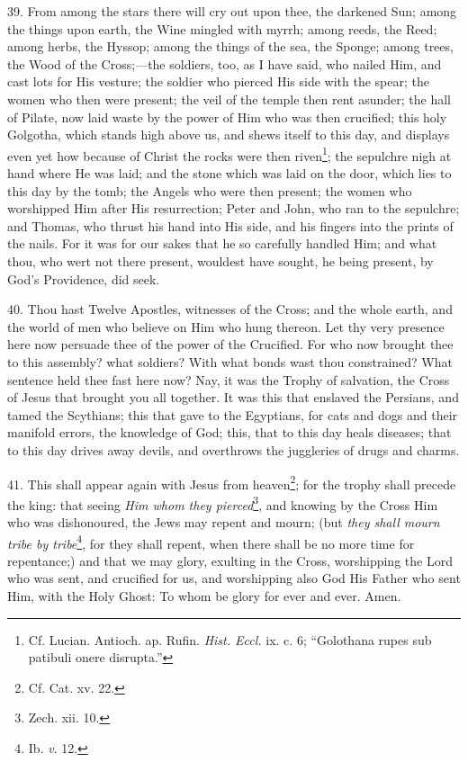 39. From among the stars there will cry out upon thee, the darkened Sun; among the things upon earth, the Wine mingled with myrrh; among reeds, the Reed; among herbs, the Hyssop; among the things of the sea, the Sponge; among trees, the Wood of the Cross;—the soldiers, too, as I have said, who nailed Him, and cast lots for His vesture; the soldier who pierced His side with the spear; the women who then were present; the veil of the temple then rent asunder; the hall of Pilate, now laid waste by the power of Him who was then crucified; this holy Golgotha, which stands high above us, and shews itself to this day, and displays even yet how because of Christ the rocks were then riven\footnote{Cf. Lucian. Antioch. ap. Rufin. \emph{Hist. Eccl.} ix. c. 6; “Golothana rupes sub patibuli onere disrupta.”}; the sepulchre nigh at hand where He was laid; and the stone which was laid on the door, which lies to this day by the tomb; the Angels who were then present; the women who worshipped Him after His resurrection; Peter and John, who ran to the sepulchre; and Thomas, who thrust his hand into His side, and his fingers into the prints of the nails. For it was for our sakes that he so carefully handled Him; and what thou, who wert not there present, wouldest have sought, he being present, by God’s Providence, did seek.

40. Thou hast Twelve Apostles, witnesses of the Cross; and the whole earth, and the world of men who believe on Him who hung thereon. Let thy very presence here now persuade thee of the power of the Crucified. For who now brought thee to this assembly? what soldiers? With what bonds wast thou constrained? What sentence held thee fast here now? Nay, it was the Trophy of salvation, the Cross of Jesus that brought you all together. It was this that enslaved the Persians, and tamed the Scythians; this that gave to the Egyptians, for cats and dogs and their manifold errors, the knowledge of God; this, that to this day heals diseases; that to this day drives away devils, and overthrows the juggleries of drugs and charms.

41. This shall appear again with Jesus from heaven\footnote{Cf. Cat. xv. 22.}; for the trophy shall precede the king: that seeing \emph{Him whom they pierced}\footnote{Zech. xii. 10.}, and knowing by the Cross Him who was dishonoured, the Jews may repent and mourn; (but \emph{they shall mourn tribe by tribe}\footnote{Ib. \emph{v}. 12.}, for they shall repent, when there shall be no more time for repentance;) and that we may glory, exulting in the Cross, worshipping the Lord who was sent, and crucified for us, and worshipping also God His Father who sent Him, with the Holy Ghost: To whom be glory for ever and ever. Amen.

